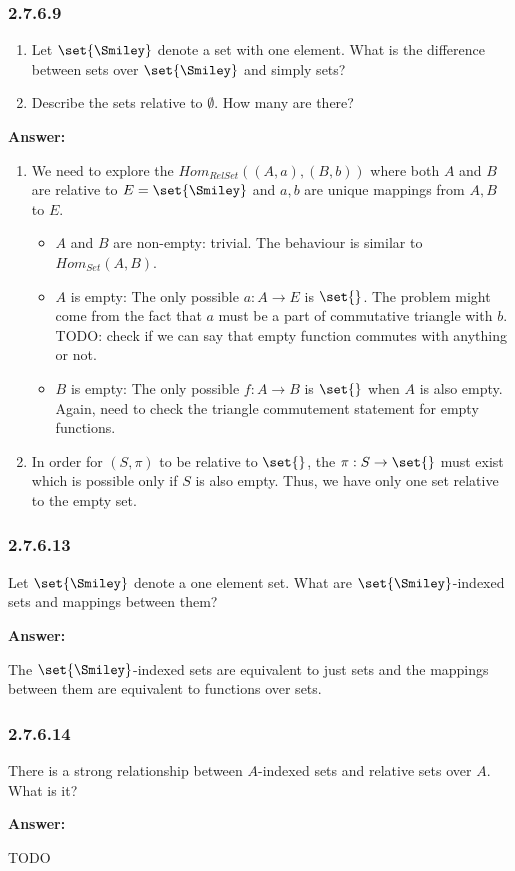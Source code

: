 \documentclass{article}
\newcommand{\vsp}[0]{\vspace*{10pt}\par}
\newcommand{\exercise}[1]{\subsubsection*{#1}}
\newcommand{\ans}[0]{\vsp\textbf{Answer: }\vsp}
\newcommand{\ei}{\item}
\newcommand{\eb}{\begin{enumerate}[label=(\alph*)]\ei}
\newcommand{\ee}{\end{enumerate}}
\begin{document}
\exercise{2.7.6.9}

\eb Let $\set{\Smiley}$ denote a set with one element. What is the difference
    between sets over $\set{\Smiley}$ and simply sets?
\ei Describe the sets relative to $\emptyset$. How many are there?
\ee

\ans

\eb We need to explore the $Hom_{RelSet}((A,a),(B,b))$ where both $A$ and $B$ are relative to
    $E=\set{\Smiley}$ and $a,b$ are unique mappings from $A,B$ to $E$.
    \begin{itemize}
    \item $A$ and $B$ are non-empty: trivial. The behaviour is similar to
          $Hom_{Set}(A,B)$.
    \item $A$ is empty: The only possible $a:A \to E$ is $\set{}$. The problem might come from the
          fact that $a$ must be a part of commutative triangle with $b$. TODO: check if we can say
          that empty function commutes with anything or not.
    \item $B$ is empty: The only possible $f:A \to B$ is $\set{}$ when $A$ is also empty. Again,
          need to check the triangle commutement statement for empty functions.
    \end{itemize}
\ei In order for $(S,\pi)$ to be relative to $\set{}$, the $\pi:S \to \set{}$ must exist which is
    possible only if $S$ is also empty. Thus, we have only one set relative to the empty set.
\ee

\exercise{2.7.6.13}

Let $\set{\Smiley}$ denote a one element set. What are $\set{\Smiley}$-indexed sets and
mappings between them?

\ans

The $\set{\Smiley}$-indexed sets are equivalent to just sets and the mappings between them are
equivalent to functions over sets.

\exercise{2.7.6.14}

There is a strong relationship between $A$-indexed sets and relative sets over $A$. What is it?

\ans

TODO

\vsp
\vsp
\vsp
\vsp

\printbibliography
\end{document}
